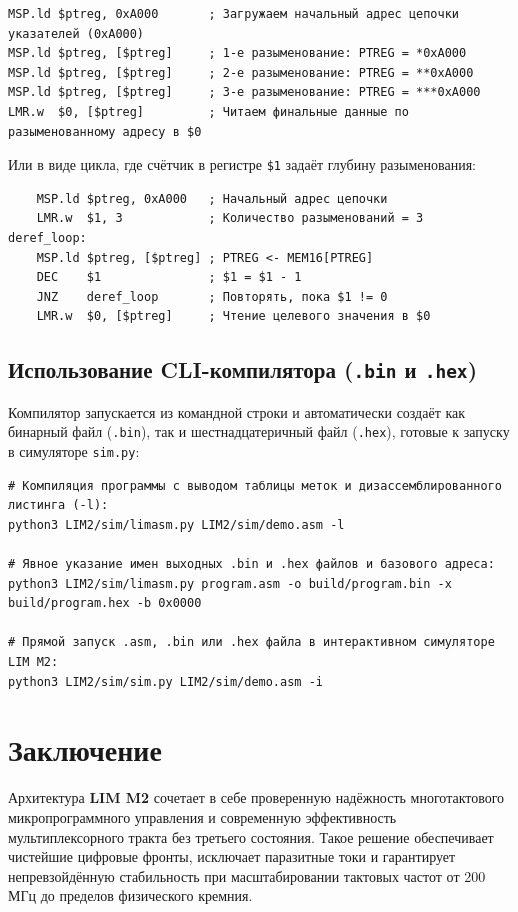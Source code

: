 \documentclass[11pt,a4paper]{article}
\begin{document}
\begin{itemize}
\begin{verbatim}
MSP.ld $ptreg, 0xA000       ; Загружаем начальный адрес цепочки указателей (0xA000)
MSP.ld $ptreg, [$ptreg]     ; 1-е разыменование: PTREG = *0xA000
MSP.ld $ptreg, [$ptreg]     ; 2-е разыменование: PTREG = **0xA000
MSP.ld $ptreg, [$ptreg]     ; 3-е разыменование: PTREG = ***0xA000
LMR.w  $0, [$ptreg]         ; Читаем финальные данные по разыменованному адресу в $0
\end{verbatim}
  Или в виде цикла, где счётчик в регистре \texttt{\$1} задаёт глубину разыменования:
\begin{verbatim}
    MSP.ld $ptreg, 0xA000   ; Начальный адрес цепочки
    LMR.w  $1, 3            ; Количество разыменований = 3
deref_loop:
    MSP.ld $ptreg, [$ptreg] ; PTREG <- MEM16[PTREG]
    DEC    $1               ; $1 = $1 - 1
    JNZ    deref_loop       ; Повторять, пока $1 != 0
    LMR.w  $0, [$ptreg]     ; Чтение целевого значения в $0
\end{verbatim}
\end{itemize}

\subsection{Использование CLI-компилятора (\texttt{.bin} и \texttt{.hex})}
Компилятор запускается из командной строки и автоматически создаёт как бинарный файл (\texttt{.bin}), так и шестнадцатеричный файл (\texttt{.hex}), готовые к запуску в симуляторе \texttt{sim.py}:
\begin{verbatim}
# Компиляция программы с выводом таблицы меток и дизассемблированного листинга (-l):
python3 LIM2/sim/limasm.py LIM2/sim/demo.asm -l

# Явное указание имен выходных .bin и .hex файлов и базового адреса:
python3 LIM2/sim/limasm.py program.asm -o build/program.bin -x build/program.hex -b 0x0000

# Прямой запуск .asm, .bin или .hex файла в интерактивном симуляторе LIM M2:
python3 LIM2/sim/sim.py LIM2/sim/demo.asm -i
\end{verbatim}

\section{Заключение}
Архитектура \textbf{LIM M2} сочетает в себе проверенную надёжность многотактового микропрограммного управления и современную эффективность мультиплексорного тракта без третьего состояния. Такое решение обеспечивает чистейшие цифровые фронты, исключает паразитные токи и гарантирует непревзойдённую стабильность при масштабировании тактовых частот от 200 МГц до пределов физического кремния.
\end{document}
